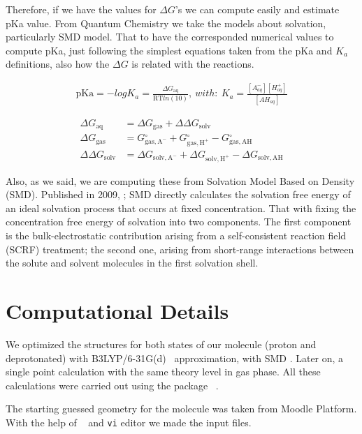 Therefore, if we have the values for $\Delta G$'s we can compute easily
and estimate pKa value. From Quantum Chemistry we take the models
about solvation, particularly SMD model. That to have the corresponded
numerical values to compute pKa, just following the simplest equations
taken from the pKa and $K_a$ definitions, also how the $\Delta G$ is
related with the reactions.

\begin{align}
\mathrm{pKa} = -logK_a = \frac{\Delta G\mathrm{_{aq}}}{\mathrm{RT}ln(10)}, \ with: \
K_a = \frac{[A^-_{aq}][H^+_{aq}]}{[AH_{aq}]}
\end{align}

\begin{align}
\Delta G\mathrm{_{aq}} &= \Delta G\mathrm{_{gas}} +
\Delta\Delta G\mathrm{_{solv}} \\\nonumber
\Delta G\mathrm{_{gas}} &= G\mathrm{^{\circ}_{gas,A^-}} +
G\mathrm{^{\circ}_{gas,H^+}} - G\mathrm{^{\circ}_{gas,AH}} \\\nonumber
\Delta\Delta G\mathrm{_{solv}} &= \Delta G\mathrm{_{solv,A^-}} +
\Delta G\mathrm{_{solv, H^+}} - \Delta G\mathrm{_{solv, AH}}
\end{align}

Also, as we said, we are computing these from Solvation Model Based on
Density (SMD). Published in 2009, \cite{Marenich2009}; SMD directly calculates
the solvation free energy of an ideal solvation process that occurs at fixed
concentration. That with fixing the concentration free energy of solvation into
two components. The first component is the bulk-electrostatic contribution
arising from a self-consistent reaction field (SCRF) treatment; the second one,
arising from short-range interactions between the solute and solvent molecules
in the first solvation shell.


\section{\textbf{Computational Details}}

We optimized the structures for both states of our molecule (proton and
deprotonated) with
B3LYP/6-31G(d)~\cite{Becke1993,Lee1988,Vosko1980,Stephens1994,Ditchfield1971}
approximation, with SMD \cite{Marenich2009}. Later on, a single point
calculation with the same theory level in gas phase. All these calculations
were carried out using the package {\sc{Gaussian16}}~\cite{g16}.

The starting guessed geometry for the molecule was taken from Moodle Platform. With the
help of {\sc{GaussView}}~\cite{g16} and \texttt{vi} editor we made the input
files.

